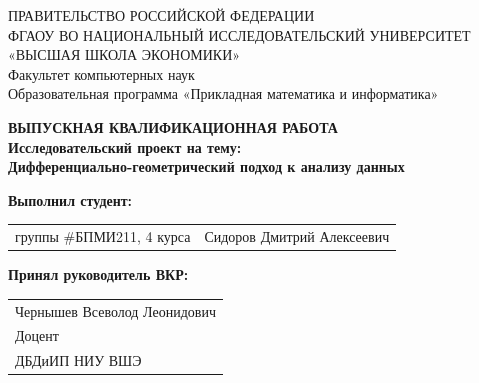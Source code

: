 \begin{titlepage}
\newpage

{
\begin{center}
ПРАВИТЕЛЬСТВО РОССИЙСКОЙ ФЕДЕРАЦИИ\\
ФГАОУ ВО НАЦИОНАЛЬНЫЙ ИССЛЕДОВАТЕЛЬСКИЙ УНИВЕРСИТЕТ\\
«ВЫСШАЯ ШКОЛА ЭКОНОМИКИ»
\\
\bigskip
Факультет компьютерных наук\\
Образовательная программа «Прикладная математика и информатика»
\end{center}
}

\vspace{7em}

\begin{center}
{\bf ВЫПУСКНАЯ КВАЛИФИКАЦИОННАЯ РАБОТА}\\
{\bf Исследовательский проект на тему:}\\
{\bf Дифференциально-геометрический подход к анализу данных}\\
\end{center}

\vspace{2em}

{\bf Выполнил студент: \vspace{2mm}}

{
\begin{tabular}{l@{\hskip 1.5cm}l}
группы \#БПМИ211, 4 курса & Сидоров Дмитрий Алексеевич
\end{tabular}}


\vspace{1em}
{\bf Принял руководитель ВКР: \vspace{2mm}}

{
\begin{tabular}{l}
Чернышев Всеволод Леонидович\\
Доцент \\
ДБДиИП НИУ ВШЭ
\end{tabular}}


\end{titlepage}
